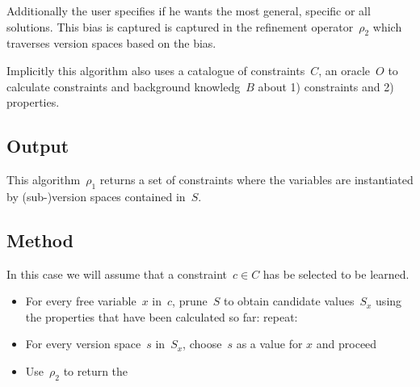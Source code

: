 \documentclass[a4paper]{article}
\begin{document}
Additionally the user specifies if he wants the most general, specific or all solutions.
This bias is captured is captured in the refinement operator~$\rho_2$ which traverses version spaces based on the bias.

Implicitly this algorithm also uses a catalogue of constraints~$C$, an oracle~$O$ to calculate constraints and background knowledg~$B$ about 1) constraints and 2) properties.

\subsection{Output}
This algorithm~$\rho_1$ returns a set of constraints where the variables are instantiated by (sub-)version spaces contained in~$S$.

\subsection{Method}
In this case we will assume that a constraint~$c \in C$ has be selected to be learned.

\begin{itemize}
 	\item For every free variable~$x$ in~$c$, prune~$S$ to obtain candidate values~$S_x$ using the properties that have been calculated so far: repeat:
 	\item For every version space~$s$ in~$S_x$, choose~$s$ as a value for $x$ and proceed
 	\item Use~$\rho_2$ to return the 
 \end{itemize} 
\end{document}
